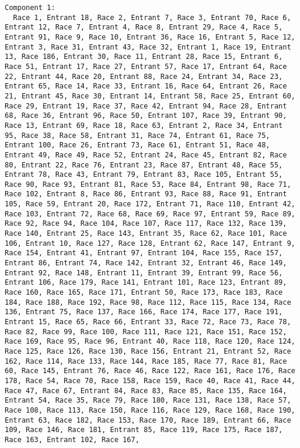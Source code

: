 \documentclass[
  letterpaper,
  DIV=11,
  numbers=noendperiod]{scrartcl}
\begin{document}
\begin{verbatim}
Component 1:
  Race 1, Entrant 18, Race 2, Entrant 7, Race 3, Entrant 70, Race 6,
Entrant 12, Race 7, Entrant 4, Race 8, Entrant 29, Race 4, Race 5,
Entrant 91, Race 9, Race 10, Entrant 36, Race 16, Entrant 5, Race 12,
Entrant 3, Race 31, Entrant 43, Race 32, Entrant 1, Race 19, Entrant
13, Race 186, Entrant 30, Race 11, Entrant 28, Race 15, Entrant 6,
Race 51, Entrant 17, Race 27, Entrant 57, Race 17, Entrant 64, Race
22, Entrant 44, Race 20, Entrant 88, Race 24, Entrant 34, Race 23,
Entrant 65, Race 14, Race 33, Entrant 16, Race 64, Entrant 26, Race
21, Entrant 45, Race 30, Entrant 14, Entrant 58, Race 25, Entrant 60,
Race 29, Entrant 19, Race 37, Race 42, Entrant 94, Race 28, Entrant
68, Race 36, Entrant 96, Race 50, Entrant 107, Race 39, Entrant 90,
Race 13, Entrant 69, Race 18, Race 63, Entrant 2, Race 34, Entrant
95, Race 38, Race 58, Entrant 31, Race 74, Entrant 61, Race 75,
Entrant 100, Race 26, Entrant 73, Race 61, Entrant 51, Race 48,
Entrant 49, Race 49, Race 52, Entrant 24, Race 45, Entrant 82, Race
80, Entrant 22, Race 76, Entrant 23, Race 87, Entrant 48, Race 55,
Entrant 78, Race 43, Entrant 79, Entrant 83, Race 105, Entrant 55,
Race 90, Race 93, Entrant 81, Race 53, Race 84, Entrant 98, Race 71,
Race 102, Entrant 8, Race 86, Entrant 93, Race 88, Race 91, Entrant
105, Race 59, Entrant 20, Race 172, Entrant 71, Race 110, Entrant 42,
Race 103, Entrant 72, Race 68, Race 69, Race 97, Entrant 59, Race 89,
Race 92, Race 94, Race 104, Race 107, Race 117, Race 132, Race 139,
Race 140, Entrant 25, Race 143, Entrant 35, Race 62, Race 101, Race
106, Entrant 10, Race 127, Race 128, Entrant 62, Race 147, Entrant 9,
Race 154, Entrant 41, Entrant 97, Entrant 104, Race 155, Race 157,
Entrant 86, Entrant 74, Race 142, Entrant 32, Entrant 46, Race 149,
Entrant 92, Race 148, Entrant 11, Entrant 39, Entrant 99, Race 56,
Entrant 106, Race 179, Race 141, Entrant 101, Race 123, Entrant 89,
Race 160, Race 165, Race 171, Entrant 50, Race 173, Race 183, Race
184, Race 188, Race 192, Race 98, Race 112, Race 115, Race 134, Race
136, Entrant 75, Race 137, Race 166, Race 174, Race 177, Race 191,
Entrant 15, Race 65, Race 66, Entrant 33, Race 72, Race 73, Race 78,
Race 82, Race 99, Race 100, Race 111, Race 121, Race 151, Race 152,
Race 169, Race 95, Race 96, Entrant 40, Race 118, Race 120, Race 124,
Race 125, Race 126, Race 130, Race 156, Entrant 21, Entrant 52, Race
162, Race 114, Race 133, Race 144, Race 185, Race 77, Race 81, Race
60, Race 145, Entrant 76, Race 46, Race 122, Race 161, Race 176, Race
178, Race 54, Race 70, Race 158, Race 159, Race 40, Race 41, Race 44,
Race 47, Race 67, Entrant 84, Race 83, Race 85, Race 135, Race 164,
Entrant 54, Race 35, Race 79, Race 180, Race 131, Race 138, Race 57,
Race 108, Race 113, Race 150, Race 116, Race 129, Race 168, Race 190,
Entrant 63, Race 182, Race 153, Race 170, Race 189, Entrant 66, Race
109, Race 146, Race 181, Entrant 85, Race 119, Race 175, Race 187,
Race 163, Entrant 102, Race 167,


\end{verbatim}
\end{document}
